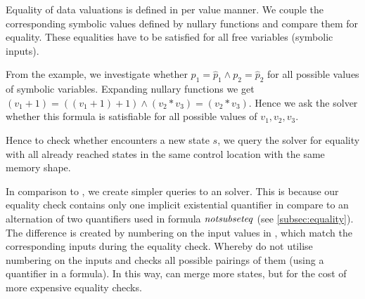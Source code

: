 Equality of data valuations is defined in per value manner. We couple the
corresponding symbolic values defined by nullary functions and compare them for
equality. These equalities have to be satisfied for all free variables (symbolic
inputs).

From the example, we investigate whether $p_1 = \widehat{p}_1 \wedge p_2 =
\widehat{p}_2$ for all possible values of symbolic variables. Expanding nullary
functions we get $(v_1 + 1) = ((v_1 + 1) + 1) \wedge (v_2 * v_3) = (v_2 * v_3)$. Hence
we ask the \SMT solver whether this formula is satisfiable for all possible
values of $v_1, v_2, v_3$.

Hence to check whether \DIVINE encounters a new state $s$, we query the \SMT solver
for equality with all already reached states in the same control location with the same memory shape.

In comparison to \SymDIVINE, we create simpler queries to an \SMT solver.  This
is because our equality check contains only one implicit existential quantifier
in compare to an alternation of two quantifiers used in \SymDIVINE formula
$\mathit{notsubseteq}$ (see \autoref{subsec:equality}). The difference is created by
numbering on the input values in \DIVINE, which match the corresponding inputs
during the equality check. Whereby \SymDIVINE do not utilise numbering on the
inputs and checks all possible pairings of them (using a quantifier in a
formula). In this way, \SymDIVINE can merge more states, but for the cost of
more expensive equality checks.


